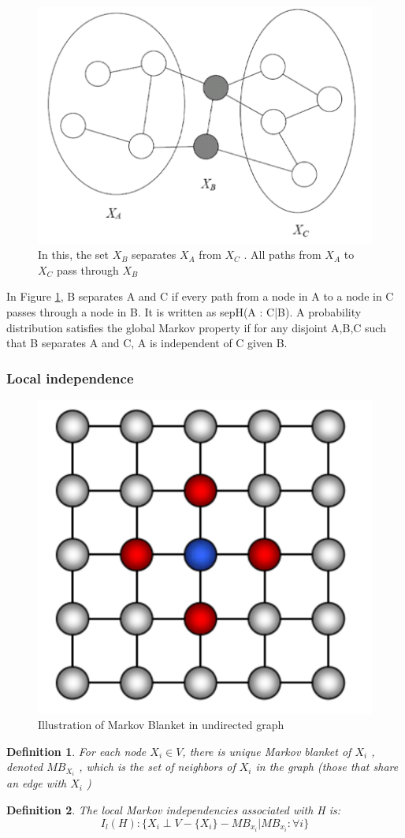 \documentclass[twoside]{article}
\newtheorem{Defn}{Definition}[section]
\begin{document}
\begin{figure}[!htb]
  \centering
  \includegraphics[width=.5\linewidth]{assets/ugm_separate.png}
  \caption{In this, the set \(X_B\) separates \(X_A\) from \(X_C\) . All paths from \(X_A\) to \(X_C\) pass through \(X_B\)}
  \label{fig:separate}
\end{figure}

In Figure \ref{fig:separate}, B separates A and C if every path from a node in A to a node in C passes through a node in B. It is written as sepH(A : C|B). A probability distribution satisfies the global Markov property if for any disjoint A,B,C such that B separates A and C, A is independent of C given B.

\subsubsection{Local independence}

\begin{figure}[!ht]
  \centering
  \includegraphics[width=0.4\linewidth]{assets/ugm_local.png}
  \caption{Illustration of Markov Blanket in undirected graph}
\end{figure}

\begin{Defn}
For each node \(X_i \in V\), there is unique Markov blanket of \(X_i\) , denoted \(MB_{X_i}\) , which is the set of neighbors of \(X_i\) in the graph (those that share an edge with \(X_i\) )
\end{Defn}

\begin{Defn}
The local Markov independencies associated with H is:
\begin{equation}
I_l(H): \{X_i \perp V - \{X_i\} - MB_{x_i} | MB_{x_i} : \forall i\}
\end{equation}
\end{Defn}
\end{document}
